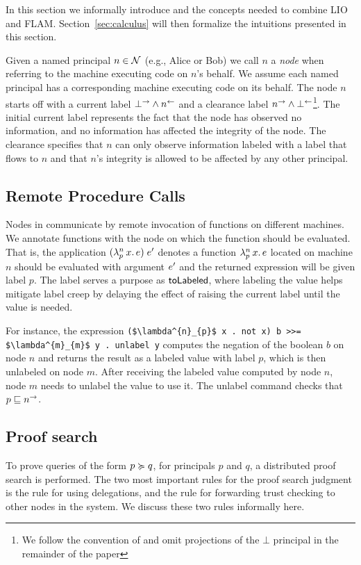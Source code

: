In this section we informally introduce \lang{} and the concepts needed to combine LIO and FLAM. Section~\ref{sec:calculus} will then formalize the intuitions presented in this section.

Given a named principal $n \in \mathcal{N}$ (e.g., Alice or Bob) we call $n$ a \emph{node} when referring to the machine executing code on $n$'s behalf. We assume each named principal has a corresponding machine executing code on its behalf. The node $n$ starts off with a current label $\bot^{\rightarrow} \wedge n^{\leftarrow}$ and a clearance label $n^{\rightarrow} \wedge \bot^{\leftarrow}$\footnote{We follow the convention of \cite{Arden:2015:FA:2859845.2859998} and omit projections of the $\bot$ principal in the remainder of the paper}. The initial current label represents the fact that the node has observed no information, and no information has affected the integrity of the node. The clearance specifies that $n$ can only observe information labeled with a label that flows to $n$ and that $n$'s integrity is allowed to be affected by any other principal.

\subsection{Remote Procedure Calls}
Nodes in \lang{} communicate by remote invocation of functions on different machines. We annotate functions with the node on which the function should be evaluated. That is, the application $(\lambda^{n}_{p}\,x.\,e)\;e'$ denotes a function $\lambda^{n}_{p}\,x.\,e$ located on machine $n$ should be evaluated with argument $e'$ and the returned expression will be given label $p$. The label serves a purpose as $\mathsf{toLabeled}$, where labeling the value helps mitigate label creep by delaying the effect of raising the current label until the value is needed.

For instance, the expression \lstinline[mathescape]!($\lambda^{n}_{p}$ x . not x) b >>= $\lambda^{m}_{m}$ y . unlabel y!
computes the negation of the boolean $b$ on node $n$ and returns the result as a labeled value with label $p$, which is then unlabeled on node $m$. After receiving the labeled value computed by node $n$, node $m$ needs to unlabel the value to use it. The unlabel command checks that $p \sqsubseteq n^{\rightarrow}$.

\subsection{Proof search}
To prove queries of the form $p \succcurlyeq q$, for principals $p$ and $q$, a distributed proof search is performed. The two most important rules for the proof search judgment is the rule for using delegations, and the rule for forwarding trust checking to other nodes in the system. We discuss these two rules informally here.


